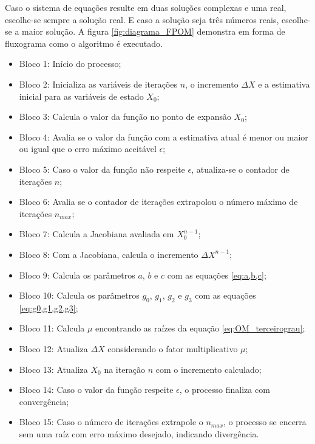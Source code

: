 Caso o sistema de equações resulte em duas soluções complexas e uma real, escolhe-se sempre a solução real. E caso a solução seja três números reais, escolhe-se a maior solução. A figura \ref{fig:diagrama_FPOM} demonstra em forma de fluxograma como o algoritmo é executado.
\begin{itemize}
    \item Bloco 1: Início do processo;
    \item Bloco 2: Inicializa as variáveis de iterações $n$, o incremento $\Delta X$ e a estimativa inicial para as variáveis de estado $X_0$;
    \item Bloco 3: Calcula o valor da função no ponto de expansão $X_0$;
    \item Bloco 4: Avalia se o valor da função com a estimativa atual é menor ou maior ou igual que o erro máximo aceitável $\epsilon$;
    \item Bloco 5: Caso o valor da função não respeite $\epsilon$, atualiza-se o contador de iterações $n$;
    \item Bloco 6: Avalia se o contador de iterações extrapolou o número máximo de iterações $n_{max}$;
    \item Bloco 7: Calcula a Jacobiana avaliada em $X_0^{n-1}$;
    \item Bloco 8: Com a Jacobiana, calcula o incremento $\Delta X^{n-1}$;
    \item Bloco 9: Calcula os parâmetros $a$, $b$ e $c$ com as equações \eqref{eq:a,b,c};
    \item Bloco 10: Calcula os parâmetros $g_0$, $g_1$, $g_2$ e $g_3$ com as equações \eqref{eq:g0,g1,g2,g3};
    \item Bloco 11: Calcula $\mu$ encontrando as raízes da equação \eqref{eq:OM_terceirograu};
    \item Bloco 12: Atualiza $\Delta X$ considerando o fator multiplicativo $\mu$;
    \item Bloco 13: Atualiza $X_0$ na iteração $n$ com o incremento calculado;
    \item Bloco 14: Caso o valor da função respeite $\epsilon$, o processo finaliza com convergência;
    \item Bloco 15: Caso o número de iterações extrapole o $n_{max}$, o processo se encerra sem uma raíz com erro máximo desejado, indicando divergência.
\end{itemize}

